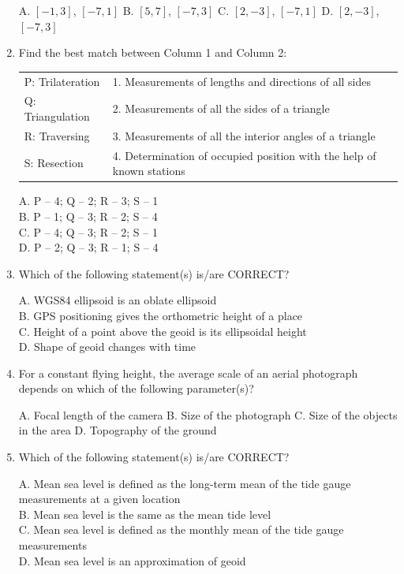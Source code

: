 \documentclass[journal,12pt,onecolumn]{IEEEtran}
\begin{document}
\begin{enumerate}
    A. $[-1, 3]$, $[-7,1]$ \quad
    B. $[5, 7]$, $[-7, 3]$ \quad
    C. $[2, -3]$, $[-7, 1]$ \quad
    D. $[2, -3]$, $[-7, 3]$

    \item Find the best match between Column 1 and Column 2:

\begin{tabular}{ll}
P: Trilateration & 1. Measurements of lengths and directions of all sides \\
Q: Triangulation & 2. Measurements of all the sides of a triangle \\
R: Traversing & 3. Measurements of all the interior angles of a triangle \\
S: Resection & 4. Determination of occupied position with the help of known stations \\
\end{tabular}

    A. P – 4; Q – 2; R – 3; S – 1 \\
    B. P – 1; Q – 3; R – 2; S – 4 \\
    C. P – 4; Q – 3; R – 2; S – 1 \\
    D. P – 2; Q – 3; R – 1; S – 4

    \item Which of the following statement(s) is/are CORRECT?

    A. WGS84 ellipsoid is an oblate ellipsoid \\
    B. GPS positioning gives the orthometric height of a place \\
    C. Height of a point above the geoid is its ellipsoidal height \\
    D. Shape of geoid changes with time

    \item For a constant flying height, the average scale of an aerial photograph depends on which of the following parameter(s)?

    A. Focal length of the camera \quad
    B. Size of the photograph \quad
    C. Size of the objects in the area \quad
    D. Topography of the ground

    \item Which of the following statement(s) is/are CORRECT?

    A. Mean sea level is defined as the long-term mean of the tide gauge measurements at a given location \\
    B. Mean sea level is the same as the mean tide level \\
    C. Mean sea level is defined as the monthly mean of the tide gauge measurements \\
    D. Mean sea level is an approximation of geoid


\end{enumerate}
\end{document}
